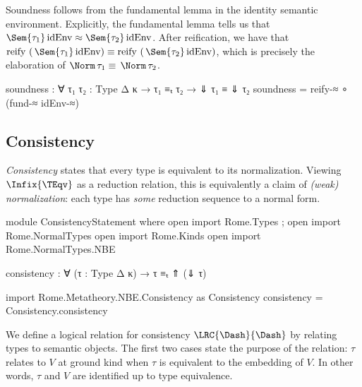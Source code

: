 \begin{AgdaAlign}
Soundness follows from the fundamental lemma in the identity semantic environment. Explicitly, the fundamental lemma tells us that $\Sem{\tau_1}\, \text{idEnv} \approx \Sem{\tau_2}\, \text{idEnv}$. After reification, we have that $\text{reify (}\, \Sem{\tau_1}\, \text{idEnv)} \equiv \text{reify (}\, \Sem{\tau_2}\, \text{idEnv)}$, which is precisely the elaboration of $\Norm \, \tau_1 \equiv \, \Norm \, \tau_2$.

\begin{code}
  soundness : ∀ {τ₁ τ₂ : Type Δ κ} → 
                τ₁ ≡ₜ τ₂ → ⇓ τ₁ ≡ ⇓ τ₂
  soundness = reify-≈ ∘ (fund-≈ idEnv-≈)
\end{code}
\end{AgdaAlign}

\subsection{Consistency}
\label{sec:consistency}

\emph{Consistency} states that every type is equivalent to its normalization. Viewing $\Infix{\TEqv}$ as a reduction relation, this is equivalently a claim of \emph{(weak) normalization}: each type has \emph{some} reduction sequence to a normal form.

\begin{AgdaAlign} 
\begin{code}[hide]
module ConsistencyStatement where
  open import Rome.Types ; open import Rome.NormalTypes
  open import Rome.Kinds
  open import Rome.NormalTypes.NBE
\end{code}
\begin{code}
  consistency : ∀ (τ : Type Δ κ) → τ ≡ₜ ⇑ (⇓ τ)
\end{code}
\begin{code}[hide]
  import Rome.Metatheory.NBE.Consistency as Consistency
  consistency = Consistency.consistency
\end{code}
\end{AgdaAlign}

We define a logical relation for consistency $\LRC{\Dash}{\Dash}$ by relating types to semantic objects. The first two cases state the purpose of the relation: $\tau$ relates to $V$ at ground kind when $\tau$ is equivalent to the embedding of $V$. In other words, $\tau$ and $V$ are identified up to type equivalence.

